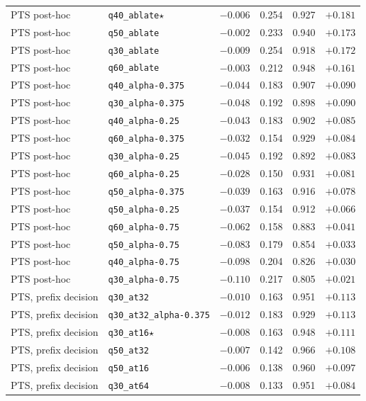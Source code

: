 {\begin{longtable}{l|l|c|cc|c}
PTS post-hoc & \texttt{q40\_ablate}$\star$ & $-0.006$ & 0.254 & 0.927 & $+0.181$ \\
PTS post-hoc & \texttt{q50\_ablate} & $-0.002$ & 0.233 & 0.940 & $+0.173$ \\
PTS post-hoc & \texttt{q30\_ablate} & $-0.009$ & 0.254 & 0.918 & $+0.172$ \\
PTS post-hoc & \texttt{q60\_ablate} & $-0.003$ & 0.212 & 0.948 & $+0.161$ \\
PTS post-hoc & \texttt{q40\_alpha-0.375} & $-0.044$ & 0.183 & 0.907 & $+0.090$ \\
PTS post-hoc & \texttt{q30\_alpha-0.375} & $-0.048$ & 0.192 & 0.898 & $+0.090$ \\
PTS post-hoc & \texttt{q40\_alpha-0.25} & $-0.043$ & 0.183 & 0.902 & $+0.085$ \\
PTS post-hoc & \texttt{q60\_alpha-0.375} & $-0.032$ & 0.154 & 0.929 & $+0.084$ \\
PTS post-hoc & \texttt{q30\_alpha-0.25} & $-0.045$ & 0.192 & 0.892 & $+0.083$ \\
PTS post-hoc & \texttt{q60\_alpha-0.25} & $-0.028$ & 0.150 & 0.931 & $+0.081$ \\
PTS post-hoc & \texttt{q50\_alpha-0.375} & $-0.039$ & 0.163 & 0.916 & $+0.078$ \\
PTS post-hoc & \texttt{q50\_alpha-0.25} & $-0.037$ & 0.154 & 0.912 & $+0.066$ \\
PTS post-hoc & \texttt{q60\_alpha-0.75} & $-0.062$ & 0.158 & 0.883 & $+0.041$ \\
PTS post-hoc & \texttt{q50\_alpha-0.75} & $-0.083$ & 0.179 & 0.854 & $+0.033$ \\
PTS post-hoc & \texttt{q40\_alpha-0.75} & $-0.098$ & 0.204 & 0.826 & $+0.030$ \\
PTS post-hoc & \texttt{q30\_alpha-0.75} & $-0.110$ & 0.217 & 0.805 & $+0.021$ \\
PTS, prefix decision & \texttt{q30\_at32} & $-0.010$ & 0.163 & 0.951 & $+0.113$ \\
PTS, prefix decision & \texttt{q30\_at32\_alpha-0.375} & $-0.012$ & 0.183 & 0.929 & $+0.113$ \\
PTS, prefix decision & \texttt{q30\_at16}$\star$ & $-0.008$ & 0.163 & 0.948 & $+0.111$ \\
PTS, prefix decision & \texttt{q50\_at32} & $-0.007$ & 0.142 & 0.966 & $+0.108$ \\
PTS, prefix decision & \texttt{q50\_at16} & $-0.006$ & 0.138 & 0.960 & $+0.097$ \\
PTS, prefix decision & \texttt{q30\_at64} & $-0.008$ & 0.133 & 0.951 & $+0.084$ \\

\end{longtable}}
